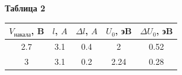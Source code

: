 \documentclass[a4paper, 12pt]{article}%
\begin{document}
\begin{center}
\textbf{Таблица 2}\\
\begin{tabular}{|c|c|c|c|c|}
\hline
\rowcolor[HTML]{9B9B9B} 
$V_{\text{накала}}$, B      & $l$, $A$ & $\Delta l$, $A$ & $U_0$, эB & $\Delta U_0$, эB \\ \hline
\cellcolor[HTML]{9B9B9B}2.7 & 3.1        & 0.4               & 2         & 0.52             \\ \hline
\rowcolor[HTML]{EFEFEF} 
\cellcolor[HTML]{9B9B9B}3   & 3.1        & 0.2               & 2.24      & 0.28             \\ \hline
\end{tabular}
\end{center}
	
	
	
	
	
	
	
	
	
	
	
	
	
	
	
	
	
	
	
	
	
	
	
	
	
	
	
	
	
\end{document}
